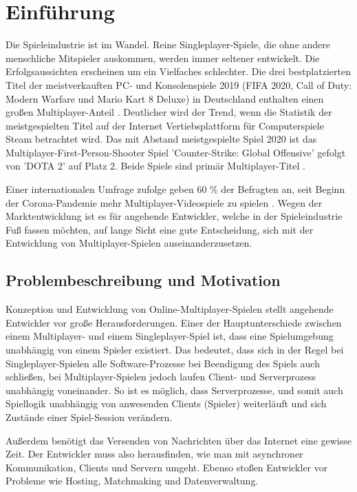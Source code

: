 \chapter{Einführung}
\label{sec:einfuehrung}

Die Spieleindustrie ist im Wandel. Reine Singleplayer-Spiele, die ohne andere menschliche Mitspieler auskommen, werden immer seltener entwickelt. Die Erfolgsaussichten erscheinen um ein Vielfaches schlechter. Die drei bestplatzierten Titel der meistverkauften PC- und Konsolenspiele 2019 (FIFA 2020, Call of Duty: Modern Warfare und Mario Kart 8 Deluxe) in Deutschland enthalten einen großen Multiplayer-Anteil \cite{gameVerbandderdeutschenGamesBranchee.V..2020}. Deutlicher wird der Trend, wenn die Statistik der meistgespielten Titel auf der Internet Vertiebsplattform für Computerspiele Steam betrachtet wird. Das mit Abstand meistgespielte Spiel 2020 ist das Multiplayer-First-Person-Shooter Spiel 'Counter-Strike: Global Offensive' gefolgt von 'DOTA 2' auf Platz 2. Beide Spiele sind primär Multiplayer-Titel \cite{GitHyp.February2021}.

Einer internationalen Umfrage zufolge geben 60 \% der Befragten an, seit Beginn der Corona-Pandemie mehr Multiplayer-Videospiele zu spielen \cite{SimonKucher&Partners.2020}. Wegen der Marktentwicklung ist es für angehende Entwickler, welche in der Spieleindustrie Fuß fassen möchten, auf lange Sicht eine gute Entscheidung, sich mit der Entwicklung von Multiplayer-Spielen auseinanderzusetzen.

\section{Problembeschreibung und Motivation}

Konzeption und Entwicklung von Online-Multiplayer-Spielen stellt angehende Entwickler vor große Herausforderungen. Einer der Hauptunterschiede zwischen einem Multiplayer- und einem Singleplayer-Spiel ist, dass eine Spielumgebung unabhängig von einem Spieler existiert. Das bedeutet, dass sich in der Regel bei Singleplayer-Spielen alle Software-Prozesse bei Beendigung des Spiels auch schließen, bei Multiplayer-Spielen jedoch laufen Client- und Serverprozess unabhängig voneinander. So ist es möglich, dass Serverprozesse, und somit auch Spiellogik unabhängig von anwesenden Clients (Spieler) weiterläuft und sich Zustände einer Spiel-Session verändern. 

Außerdem benötigt das Versenden von Nachrichten über das Internet eine gewisse Zeit. Der Entwickler muss also herausfinden, wie man mit asynchroner Kommunikation, Clients und Servern umgeht. Ebenso stoßen Entwickler vor Probleme wie Hosting, Matchmaking und Datenverwaltung.
\cite{Payne.18.09.2019}

